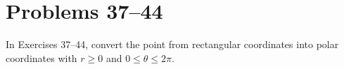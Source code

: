 \section{Problems 37--44}

In Exercises 37--44, convert the point from rectangular coordinates into polar coordinates with $r \geq 0$ and $0 \leq \theta \leq 2\pi$.